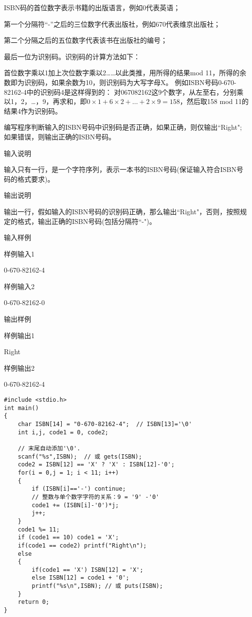 ISBN码的首位数字表示书籍的出版语言，例如0代表英语；

第一个分隔符“-”之后的三位数字代表出版社，例如670代表维京出版社；

第二个分隔之后的五位数字代表该书在出版社的编号；

最后一位为识别码。识别码的计算方法如下：

首位数字乘以1加上次位数字乘以2……以此类推，用所得的结果mod 11，所得的余数即为识别码，如果余数为10，则识别码为大写字母X。
例如ISBN号码0-670-82162-4中的识别码4是这样得到的：
对067082162这9个数字，从左至右，分别乘以1，2，\dots，9，再求和，即$0\times 1+6\times 2+\dots +2\times 9=158$，然后取158 mod 11的结果4作为识别码。

编写程序判断输入的ISBN号码中识别码是否正确，如果正确，则仅输出``Right"; 如果错误，则输出正确的ISBN号码。

输入说明	

输入只有一行，是一个字符序列，表示一本书的ISBN号码(保证输入符合ISBN号码的格式要求)。

输出说明	

输出一行，假如输入的ISBN号码的识别码正确，那么输出``Right"，否则，按照规定的格式，输出正确的ISBN号码(包括分隔符``-")。

输入样例	

样例输入1

0-670-82162-4

样例输入2

0-670-82162-0

输出样例	

样例输出1

Right

样例输出2

0-670-82162-4

\begin{lstlisting}
#include <stdio.h>
int main()
{
	char ISBN[14] = "0-670-82162-4";  // ISBN[13]='\0'
	int i,j, code1 = 0, code2;
	
	// 末尾自动添加'\0'.
	scanf("%s",ISBN);  // 或 gets(ISBN); 
	code2 = ISBN[12] == 'X' ? 'X' : ISBN[12]-'0';
	for(i = 0,j = 1; i < 11; i++)
	{
		if (ISBN[i]=='-') continue;
		// 整数与单个数字字符的关系：9 = '9' -'0' 
		code1 += (ISBN[i]-'0')*j;  
		j++;
	}   
	code1 %= 11;
	if (code1 == 10) code1 = 'X';  
	if(code1 == code2) printf("Right\n");
	else 
	{
		if(code1 == 'X') ISBN[12] = 'X';
		else ISBN[12] = code1 + '0';
		printf("%s\n",ISBN); // 或 puts(ISBN);
	}
	return 0;
} 
\end{lstlisting}

